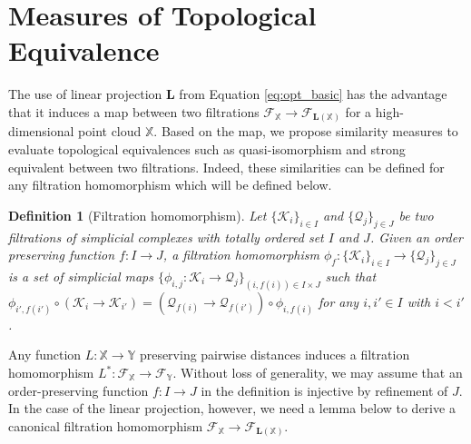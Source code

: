 \documentclass[11pt]{article}
\newtheorem{definition}{Definition}
\newcommand{\bfL}{\mathbf{L}}
\newcommand{\ptcloudx}{\mathbb{X}} %
\begin{document}
\section{Measures of Topological Equivalence}\label{sec:theory}

The use of linear projection $\bfL$ from Equation \eqref{eq:opt_basic} has the advantage that it induces a map between two filtrations $\mathcal{F}_{\ptcloudx}\to \mathcal{F}_{\mathbf{L}(\ptcloudx)}$ for a high-dimensional point cloud $\ptcloudx$. Based on the map, we propose similarity measures to evaluate topological equivalences such as quasi-isomorphism and strong equivalent between two filtrations. Indeed, these similarities can be defined for any filtration homomorphism which will be defined below. 

\begin{definition}[Filtration homomorphism]
	Let $\{\mathcal{K}_{i} \}_{i \in I}$ and $\{\mathcal{Q}_{j} \}_{j \in J}$ be two filtrations of simplicial complexes with totally ordered set $I$ and $J$. Given an order preserving function $f:I \to J$, a \emph{filtration homomorphism} $\phi_{f}:\{\mathcal{K}_{i} \}_{i \in I} \to \{\mathcal{Q}_{j} \}_{j \in J}$ is a set of simplicial maps $\{\phi_{i,j}:\mathcal{K}_{i} \to \mathcal{Q}_{j} \}_{(i,f(i)) \in I \times J}$ such that $\phi_{i',f(i')} \circ (\mathcal{K}_{i} \to \mathcal{K}_{i'}) =(\mathcal{Q}_{f(i)} \to \mathcal{Q}_{f(i')}) \circ \phi_{i,f(i)}$ for any $i,i' \in I$ with $i<i'$.
\end{definition}

Any function $L:\ptcloudx \to \mathbb{Y}$ preserving pairwise distances induces a filtration homomorphism $L^{\ast}:\mathcal{F}_{\ptcloudx}\to \mathcal{F}_{\mathbb{Y}}$. Without loss of generality, we may assume that an order-preserving function $f:I \to J$ in the definition is injective by refinement of $J$. In the case of the linear projection, however, we need a lemma below to derive a canonical filtration homomorphism $\mathcal{F}_{\ptcloudx}\to \mathcal{F}_{\mathbf{L}(\ptcloudx)}$.
\end{document}
